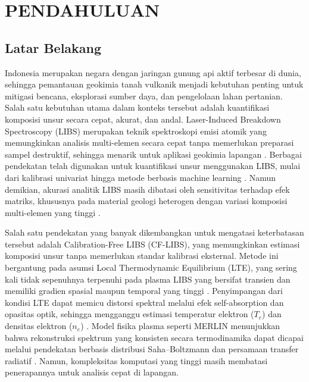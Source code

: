 
\chapter{PENDAHULUAN}

\section{Latar Belakang}
Indonesia merupakan negara dengan jaringan gunung api aktif terbesar di dunia, sehingga pemantauan geokimia tanah vulkanik menjadi kebutuhan penting untuk mitigasi bencana, eksplorasi sumber daya, dan pengelolaan lahan pertanian. Salah satu kebutuhan utama dalam konteks tersebut adalah kuantifikasi komposisi unsur secara cepat, akurat, dan andal. Laser-Induced Breakdown Spectroscopy (LIBS) merupakan teknik spektroskopi emisi atomik yang memungkinkan analisis multi-elemen secara cepat tanpa memerlukan preparasi sampel destruktif, sehingga menarik untuk aplikasi geokimia lapangan \citep{legnaioli_laser-induced_2025, sawyers_database_2025}. Berbagai pendekatan telah digunakan untuk kuantifikasi unsur menggunakan LIBS, mulai dari kalibrasi univariat hingga metode berbasis machine learning \citep{zhang_improving_2025, babos_laser-induced_2024}. Namun demikian, akurasi analitik LIBS masih dibatasi oleh sensitivitas terhadap efek matriks, khususnya pada material geologi heterogen dengan variasi komposisi multi-elemen yang tinggi \citep{hao_machine_2024}.

Salah satu pendekatan yang banyak dikembangkan untuk mengatasi keterbatasan tersebut adalah Calibration-Free LIBS (CF-LIBS), yang memungkinkan estimasi komposisi unsur tanpa memerlukan standar kalibrasi eksternal. Metode ini bergantung pada asumsi Local Thermodynamic Equilibrium (LTE), yang sering kali tidak sepenuhnya terpenuhi pada plasma LIBS yang bersifat transien dan memiliki gradien spasial maupun temporal yang tinggi \citep{cristoforetti_local_2010, zaitsev_two-zone_2024}. Penyimpangan dari kondisi LTE dapat memicu distorsi spektral melalui efek self-absorption dan opasitas optik, sehingga mengganggu estimasi temperatur elektron ($T_e$) dan densitas elektron ($n_e$) \citep{tang_review_2024}. Model fisika plasma seperti MERLIN menunjukkan bahwa rekonstruksi spektrum yang konsisten secara termodinamika dapat dicapai melalui pendekatan berbasis distribusi Saha--Boltzmann dan persamaan transfer radiatif \citep{favre_merlin_2025}. Namun, kompleksitas komputasi yang tinggi masih membatasi penerapannya untuk analisis cepat di lapangan.


